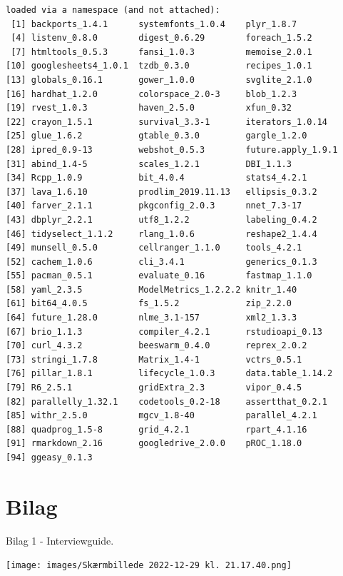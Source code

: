 \documentclass[
  12pt,
  a4paper,
  DIV=11,
  numbers=noendperiod]{scrartcl}
\begin{document}
\begin{verbatim}
loaded via a namespace (and not attached):
 [1] backports_1.4.1      systemfonts_1.0.4    plyr_1.8.7          
 [4] listenv_0.8.0        digest_0.6.29        foreach_1.5.2       
 [7] htmltools_0.5.3      fansi_1.0.3          memoise_2.0.1       
[10] googlesheets4_1.0.1  tzdb_0.3.0           recipes_1.0.1       
[13] globals_0.16.1       gower_1.0.0          svglite_2.1.0       
[16] hardhat_1.2.0        colorspace_2.0-3     blob_1.2.3          
[19] rvest_1.0.3          haven_2.5.0          xfun_0.32           
[22] crayon_1.5.1         survival_3.3-1       iterators_1.0.14    
[25] glue_1.6.2           gtable_0.3.0         gargle_1.2.0        
[28] ipred_0.9-13         webshot_0.5.3        future.apply_1.9.1  
[31] abind_1.4-5          scales_1.2.1         DBI_1.1.3           
[34] Rcpp_1.0.9           bit_4.0.4            stats4_4.2.1        
[37] lava_1.6.10          prodlim_2019.11.13   ellipsis_0.3.2      
[40] farver_2.1.1         pkgconfig_2.0.3      nnet_7.3-17         
[43] dbplyr_2.2.1         utf8_1.2.2           labeling_0.4.2      
[46] tidyselect_1.1.2     rlang_1.0.6          reshape2_1.4.4      
[49] munsell_0.5.0        cellranger_1.1.0     tools_4.2.1         
[52] cachem_1.0.6         cli_3.4.1            generics_0.1.3      
[55] pacman_0.5.1         evaluate_0.16        fastmap_1.1.0       
[58] yaml_2.3.5           ModelMetrics_1.2.2.2 knitr_1.40          
[61] bit64_4.0.5          fs_1.5.2             zip_2.2.0           
[64] future_1.28.0        nlme_3.1-157         xml2_1.3.3          
[67] brio_1.1.3           compiler_4.2.1       rstudioapi_0.13     
[70] curl_4.3.2           beeswarm_0.4.0       reprex_2.0.2        
[73] stringi_1.7.8        Matrix_1.4-1         vctrs_0.5.1         
[76] pillar_1.8.1         lifecycle_1.0.3      data.table_1.14.2   
[79] R6_2.5.1             gridExtra_2.3        vipor_0.4.5         
[82] parallelly_1.32.1    codetools_0.2-18     assertthat_0.2.1    
[85] withr_2.5.0          mgcv_1.8-40          parallel_4.2.1      
[88] quadprog_1.5-8       grid_4.2.1           rpart_4.1.16        
[91] rmarkdown_2.16       googledrive_2.0.0    pROC_1.18.0         
[94] ggeasy_0.1.3        
\end{verbatim}

\hypertarget{bilag}{%
\section{Bilag}\label{bilag}}

Bilag 1 - Interviewguide.

\texttt{[image: images/Skærmbillede 2022-12-29 kl. 21.17.40.png]}
\end{document}
